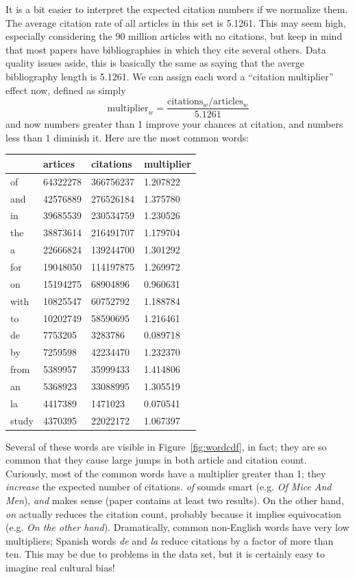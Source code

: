 \documentclass[twocolumn]{article}
\begin{document}
\medskip
It is a bit easier to interpret the expected citation numbers if we
normalize them. The average citation rate of all articles in this set
is 5.1261. This may seem high, especially considering the 90 million
articles with no citations, but keep in mind that most papers have
bibliographies in which they cite several others. Data quality issues
aside, this is basically the same as saying that the averge
bibliography length is 5.1261. We can assign each word a ``citation
multiplier'' effect now, defined as simply
$$
\mathrm{multiplier}_w = \frac{\mathrm{citations}_w / \mathrm{articles}_w}{5.1261}
$$
and now numbers greater than 1 improve your chances at citation, and
numbers less than 1 diminish it. Here are the most common words:

\begin{tabular}{l|l|l|l}
\,  & artices & citations & multiplier \\
  \hline
of & 64322278 & 366756237 & 1.207822 \\
and & 42576889 & 276526184 & 1.375780 \\
in & 39685539 & 230534759 & 1.230526 \\
the & 38873614 & 216491707 & 1.179704 \\
a   & 22666824 & 139244700 & 1.301292 \\
for & 19048050 & 114197875 & 1.269972 \\
on & 15194275 & 68904896 & 0.960631 \\
with & 10825547 & 60752792 & 1.188784 \\
to & 10202749 & 58590695 & 1.216461 \\
de & 7753205 & 3283786 & 0.089718 \\
by & 7259598 & 42234470 & 1.232370 \\
from & 5389957 & 35999433 & 1.414806 \\
an & 5368923 & 33088995 & 1.305519 \\
la & 4417389 & 1471023 & 0.070541 \\
study & 4370395 & 22022172 & 1.067397 \\
\end{tabular}

Several of these words are visible in Figure~\ref{fig:wordcdf}, in
fact; they are so common that they cause large jumps in both article
and citation count. Curiously, most of the common words have a
multiplier greater than 1; they {\em increase} the expected number of
citations. {\em of} sounds smart (e.g. {\em Of Mice And Men}), {\em
  and} makes sense (paper contains at least two results). On the other
hand, {\em on} actually reduces the citation count, probably because
it implies equivocation (e.g. {\em On the other hand}). Dramatically,
common non-English words have very low multipliers; Spanish words {\em
  de} and {\em la} reduce citations by a factor of more than ten. This
may be due to problems in the data set, but it is certainly easy to
imagine real cultural bias!
\end{document}
